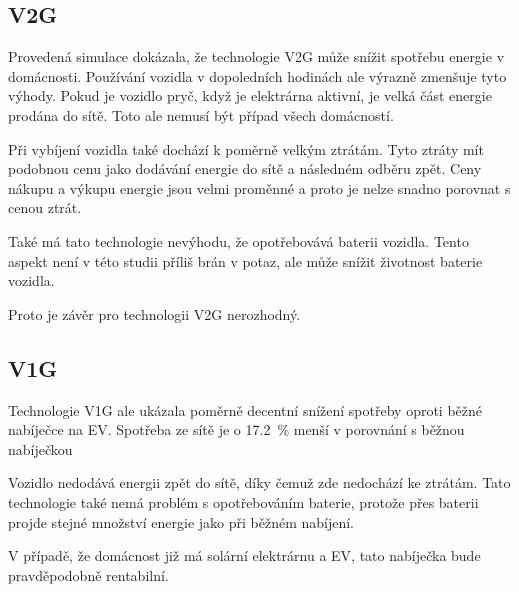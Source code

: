 \documentclass[12pt,a4paper]{Cotmas-2018}
\begin{document}
\subsection{V2G}

Provedená simulace dokázala, že technologie V2G může snížit spotřebu energie v domácnosti.
Používání vozidla v dopoledních hodinách ale výrazně zmenšuje tyto výhody.
Pokud je vozidlo pryč, když je elektrárna aktivní, je velká část energie prodána do sítě.
Toto ale nemusí být případ všech domácností.

Při vybíjení vozidla také dochází k poměrně velkým ztrátám.
Tyto ztráty mít podobnou cenu jako dodávání energie do sítě a následném odběru zpět.
Ceny nákupu a výkupu energie jsou velmi proměnné a proto je nelze snadno porovnat s cenou ztrát.

Také má tato technologie nevýhodu, že opotřebovává baterii vozidla.
Tento aspekt není v této studii příliš brán v potaz, ale může snížit životnost baterie vozidla.

Proto je závěr pro technologii V2G nerozhodný.

\subsection{V1G}

Technologie V1G ale ukázala poměrně decentní snížení spotřeby oproti běžné nabíječce na EV.
Spotřeba ze sítě je o 17.2~\% menší v porovnání s běžnou nabíječkou

Vozidlo nedodává energii zpět do sítě, díky čemuž zde nedochází ke ztrátám.
Tato technologie také nemá problém s opotřebováním baterie,
protože přes baterii projde stejné množství energie jako při běžném nabíjení.

V případě, že domácnost již má solární elektrárnu a EV,
tato nabíječka bude pravděpodobně rentabilní.

\newpage

\printbibliography
\end{document}
